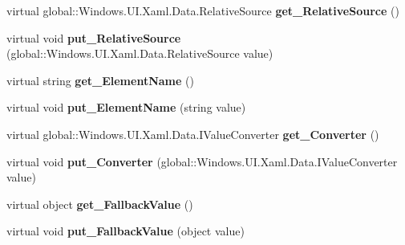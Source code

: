 \begin{DoxyCompactItemize}
virtual global\+::\+Windows.\+U\+I.\+Xaml.\+Data.\+Relative\+Source {\bfseries get\+\_\+\+Relative\+Source} ()
\item 
\mbox{\label{class_windows_1_1_u_i_1_1_xaml_1_1_data_1_1_binding_a9e13fc7038d328684876c114c0262cd2}} 
virtual void {\bfseries put\+\_\+\+Relative\+Source} (global\+::\+Windows.\+U\+I.\+Xaml.\+Data.\+Relative\+Source value)
\item 
\mbox{\label{class_windows_1_1_u_i_1_1_xaml_1_1_data_1_1_binding_a93680aa9f018dd4f75ac7515c0a00ebf}} 
virtual string {\bfseries get\+\_\+\+Element\+Name} ()
\item 
\mbox{\label{class_windows_1_1_u_i_1_1_xaml_1_1_data_1_1_binding_aabd010dd96a55bf922196a78fe1ad2ed}} 
virtual void {\bfseries put\+\_\+\+Element\+Name} (string value)
\item 
\mbox{\label{class_windows_1_1_u_i_1_1_xaml_1_1_data_1_1_binding_a75056d5c72401518166caead820596d9}} 
virtual global\+::\+Windows.\+U\+I.\+Xaml.\+Data.\+I\+Value\+Converter {\bfseries get\+\_\+\+Converter} ()
\item 
\mbox{\label{class_windows_1_1_u_i_1_1_xaml_1_1_data_1_1_binding_a5721074cd9c3ec7e50bd6d5b645234e7}} 
virtual void {\bfseries put\+\_\+\+Converter} (global\+::\+Windows.\+U\+I.\+Xaml.\+Data.\+I\+Value\+Converter value)
\item 
\mbox{\label{class_windows_1_1_u_i_1_1_xaml_1_1_data_1_1_binding_a907080aef9cb5f5df15684599707b3ba}} 
virtual object {\bfseries get\+\_\+\+Fallback\+Value} ()
\item 
\mbox{\label{class_windows_1_1_u_i_1_1_xaml_1_1_data_1_1_binding_ac1d4f41e87949cd4ffad38415709db6c}} 
virtual void {\bfseries put\+\_\+\+Fallback\+Value} (object value)
\item 
\mbox{\label{class_windows_1_1_u_i_1_1_xaml_1_1_data_1_1_binding_ae314033417c6ca80ae3826ead1750150}} 

\end{DoxyCompactItemize}
